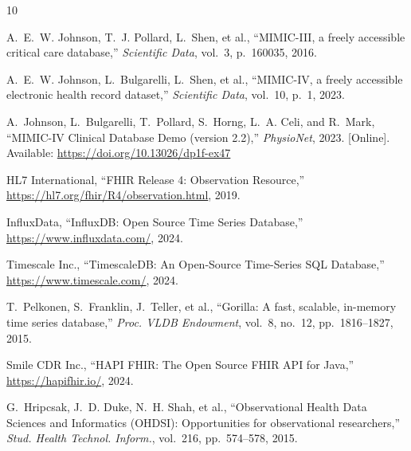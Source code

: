 \documentclass[journal]{IEEEtran}
\begin{document}
\begin{thebibliography}{10}

A.~E.~W. Johnson, T.~J. Pollard, L.~Shen, et al., ``MIMIC-III, a freely accessible critical care database,'' \textit{Scientific Data}, vol.~3, p.~160035, 2016.

A.~E.~W. Johnson, L.~Bulgarelli, L.~Shen, et al., ``MIMIC-IV, a freely accessible electronic health record dataset,'' \textit{Scientific Data}, vol.~10, p.~1, 2023.

A.~Johnson, L.~Bulgarelli, T.~Pollard, S.~Horng, L.~A. Celi, and R.~Mark, ``MIMIC-IV Clinical Database Demo (version 2.2),'' \textit{PhysioNet}, 2023. [Online]. Available: \url{https://doi.org/10.13026/dp1f-ex47}

HL7 International, ``FHIR Release 4: Observation Resource,'' \url{https://hl7.org/fhir/R4/observation.html}, 2019.

InfluxData, ``InfluxDB: Open Source Time Series Database,'' \url{https://www.influxdata.com/}, 2024.

Timescale Inc., ``TimescaleDB: An Open-Source Time-Series SQL Database,'' \url{https://www.timescale.com/}, 2024.

T.~Pelkonen, S.~Franklin, J.~Teller, et al., ``Gorilla: A fast, scalable, in-memory time series database,'' \textit{Proc. VLDB Endowment}, vol.~8, no.~12, pp.~1816--1827, 2015.

Smile CDR Inc., ``HAPI FHIR: The Open Source FHIR API for Java,'' \url{https://hapifhir.io/}, 2024.

G.~Hripcsak, J.~D. Duke, N.~H. Shah, et al., ``Observational Health Data Sciences and Informatics (OHDSI): Opportunities for observational researchers,'' \textit{Stud. Health Technol. Inform.}, vol.~216, pp.~574--578, 2015.

\end{thebibliography}
\end{document}

